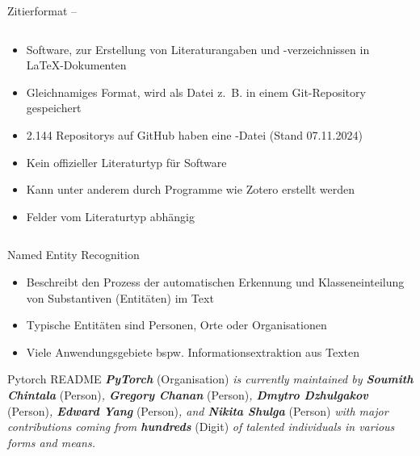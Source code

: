\documentclass[%
    handout,
    aspectratio=1610,
    10pt,
    onlytextwidth, %
]{beamer}
\begin{document}
\begin{frame}{Zitierformat – }
    \begin{columns}
        \begin{column}[t]{0.49\textwidth}
            \justifying
            \begin{itemize}
                \item Software, zur Erstellung von Literaturangaben und -verzeichnissen in \LaTeX-Dokumenten
                \item Gleichnamiges Format, wird als Datei z.~B. in einem Git-Repository gespeichert
                \item 2.144 Repositorys auf GitHub haben eine -Datei (Stand 07.11.2024)
                \item Kein offizieller Literaturtyp für Software
                \item Kann unter anderem durch Programme wie Zotero erstellt werden \autocite{zotero_zotero_2024}
                \item Felder vom Literaturtyp abhängig
            \end{itemize}
        \end{column}
        \begin{column}[t]{0.49\textwidth}
            \justifying
            \inputminted{text}{../CITATION.bib}
        \end{column}
    \end{columns}
\end{frame}

\begin{frame}{Named Entity Recognition}
    \begin{itemize}
        \item Beschreibt den Prozess der automatischen Erkennung und Klasseneinteilung von Substantiven (Entitäten) im Text
        \item Typische Entitäten sind Personen, Orte oder Organisationen
        \item Viele Anwendungsgebiete bspw. Informationsextraktion aus Texten
    \end{itemize}
    \begin{exampleblock}{Pytorch README}
        \emph{\textbf{PyTorch}} (Organisation) \emph{is currently maintained by \textbf{Soumith Chintala}} (Person)\emph{, \textbf{Gregory Chanan}} (Person)\emph{, \textbf{Dmytro Dzhulgakov}} (Person)\emph{, \textbf{Edward Yang}} (Person)\emph{, and \textbf{Nikita Shulga}} (Person) \emph{with major contributions coming from \textbf{hundreds}} (Digit) \emph{of talented individuals in various forms and means.}
    \end{exampleblock}
\end{frame}
\end{document}
